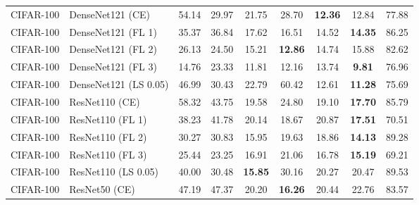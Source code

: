 \begin{table}[h!]
{\begin{tabular}{llccccccc}
   CIFAR-100 &            DenseNet121 (CE) &                  54.14 &        29.97 &                  21.75 &                  28.70 & \textbf{12.36} &                  12.84 &                  77.88 \\
   CIFAR-100 &          DenseNet121 (FL 1) &                  35.37 &        36.84 &                  17.62 &                  16.51 &                  14.52 & \textbf{14.35} &                  86.25 \\
   CIFAR-100 &          DenseNet121 (FL 2) &                  26.13 &        24.50 &                  15.21 & \textbf{12.86} &                  14.74 &                  15.88 &                  82.62 \\
   CIFAR-100 &          DenseNet121 (FL 3) &                  14.76 &        23.33 &                  11.81 &                  12.16 &                  13.74 &  \textbf{9.81} &                  76.96 \\
   CIFAR-100 &       DenseNet121 (LS 0.05) &                  46.99 &        30.43 &                  22.79 &                  60.42 &                  12.61 & \textbf{11.28} &                  75.69 \\
   CIFAR-100 &              ResNet110 (CE) &                  58.32 &        43.75 &                  19.58 &                  24.80 &                  19.10 & \textbf{17.70} &                  85.79 \\
   CIFAR-100 &            ResNet110 (FL 1) &                  38.23 &        41.78 &                  20.14 &                  18.67 &                  20.87 & \textbf{17.51} &                  70.51 \\
   CIFAR-100 &            ResNet110 (FL 2) &                  30.27 &        30.83 &                  15.95 &                  19.63 &                  18.86 & \textbf{14.13} &                  89.28 \\
   CIFAR-100 &            ResNet110 (FL 3) &                  25.44 &        23.25 &                  16.91 &                  21.06 &                  16.78 & \textbf{15.19} &                  69.21 \\
   CIFAR-100 &         ResNet110 (LS 0.05) &                  40.00 &        30.48 & \textbf{15.85} &                  30.16 &                  20.27 &                  20.47 &                  89.53 \\
   CIFAR-100 &               ResNet50 (CE) &                  47.19 &        47.37 &                  20.20 & \textbf{16.26} &                  20.44 &                  22.76 &                  83.57 \\

\end{tabular}}
\end{table}
